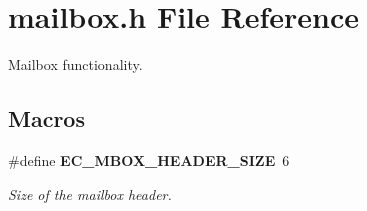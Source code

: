 \section{mailbox.\-h File Reference}
\label{mailbox_8h}


Mailbox functionality.  


\subsection*{Macros}
\begin{DoxyCompactItemize}
\item 
\#define {\bf E\-C\-\_\-\-M\-B\-O\-X\-\_\-\-H\-E\-A\-D\-E\-R\-\_\-\-S\-I\-Z\-E}~6\label{mailbox_8h_a189582ffd5ea94b41b00482c04968291}

\begin{DoxyCompactList}\small\item\em Size of the mailbox header. \end{DoxyCompactList}\end{DoxyCompactItemize}

